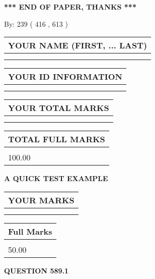 \documentclass[12pt]{article}
\begin{document}
\vspace{1.0in} 
{\textbf{\large{ *** END OF PAPER, THANKS *** }}} 
   
   
\hspace{1.0in} By: 
 239 ( 416 ,  613 )
   
   
   
   
\newpage 
\setcounter{page}{ 
   589001 } 
   
   
   
   
\noindent\begin{tabular}{|l|}
\hline
YOUR NAME (FIRST, ... LAST)  \\
\hline
 \\ 
 \\ 
\hline
\end{tabular}
\hspace{0.05in} \begin{tabular}{|l|}
\hline
 YOUR   ID   INFORMATION  \\
\hline
 \\ 
 \\ 
\hline
\end{tabular}
   
   
\vspace{0.2in}\noindent\begin{tabular}{|l|}
\hline
YOUR TOTAL MARKS  \\
\hline
 \\ 
 \\ 
\hline
\end{tabular}
\hspace{0.05in} \begin{tabular}{|l|}
\hline
TOTAL FULL MARKS  \\
\hline
 \\ 
100.00 \\
\hline
\end{tabular}
   
   
 \vspace{0.2in}
{\LARGE {\textbf{ A QUICK TEST EXAMPLE}}}
   
   
  
\vspace{0.2in}
  
\noindent\begin{tabular}{|l|}
\hline
 YOUR MARKS  \\
\hline
 \\ 
 \\ 
\hline
\end{tabular}
\hspace{0.05in} \begin{tabular}{|l|}
\hline
 Full Marks  \\
\hline
 \\ 
50.00 \\
\hline
\end{tabular}
{\textbf{\Large{QUESTION
589.1 
}}}
  
\end{document}
